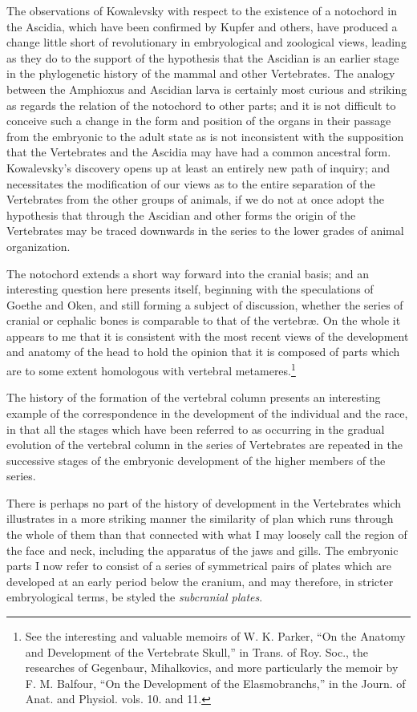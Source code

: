 \documentclass[a4paper, 11pt, oneside, english]{article}
\begin{document}
The observations of Kowalevsky with respect to the existence of a notochord in the Ascidia, which have been confirmed by Kupfer and others, have produced a change little short of revolutionary in embryological and zoological views, leading as they do to the support of the hypothesis that the Ascidian is an earlier stage in the phylogenetic history of the mammal and other Vertebrates. The analogy between the Amphioxus and Ascidian larva is certainly most curious and striking as regards the relation of the notochord to other parts; and it is not difficult to conceive such a change in the form and position of the organs in their passage from the embryonic to the adult state as is not inconsistent with the supposition that the Vertebrates and the Ascidia may have had a common ancestral form. Kowalevsky's discovery opens up at least an entirely new path of inquiry; and necessitates the modification of our views as to the entire separation of the Vertebrates from the other groups of animals, if we do not at once adopt the hypothesis that through the Ascidian and other forms the origin of the Vertebrates may be traced downwards in the series to the lower grades of animal organization.

The notochord extends a short way forward into the cranial basis; and an interesting question here presents itself, beginning with the speculations of Goethe and Oken, and still forming a subject of discussion, whether the series of cranial or cephalic bones is comparable to that of the vertebræ. On the whole it appears to me that it is consistent with the most recent views of the development and anatomy of the head to hold the opinion that it is composed of parts which are to some extent homologous with vertebral metameres.\footnote{See the interesting and valuable memoirs of W. K. Parker, ``On the Anatomy and Development of the Vertebrate Skull,'' in Trans. of Roy. Soc., the researches of Gegenbaur, Mihalkovics, and more particularly the memoir by F. M. Balfour, ``On the Development of the Elasmobranchs,'' in the Journ. of Anat. and Physiol. vols. 10. and 11.}

The history of the formation of the vertebral column presents an interesting example of the correspondence in the development of the individual and the race, in that all the stages which have been referred to as occurring in the gradual evolution of the vertebral column in the series of Vertebrates are repeated in the successive stages of the embryonic development of the higher members of the series.

There is perhaps no part of the history of development in the Vertebrates which illustrates in a more striking manner the similarity of plan which runs through the whole of them than that connected with what I may loosely call the region of the face and neck, including the apparatus of the jaws and gills. The embryonic parts I now refer to consist of a series of symmetrical pairs of plates which are developed at an early period below the cranium, and may therefore, in stricter embryological terms, be styled the \emph{subcranial plates}.
\end{document}
